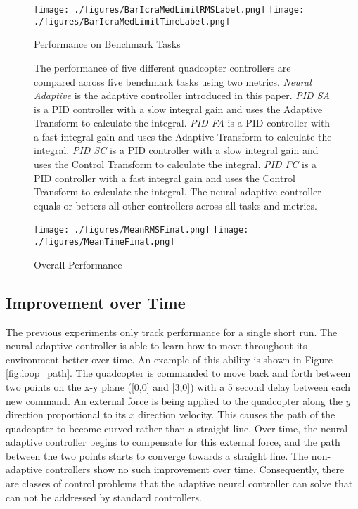 \documentclass[letterpaper, 10 pt, conference]{ieeeconf}  %
\begin{document}
\begin{figure}
\centering
\texttt{[image: ./figures/BarIcraMedLimitRMSLabel.png]}
\texttt{[image: ./figures/BarIcraMedLimitTimeLabel.png]}
\caption{Performance on Benchmark Tasks}
\label{fig:Benchmarks}
\captionsetup{singlelinecheck=off,font=footnotesize}
\caption*{The performance of five different quadcopter controllers are compared across five benchmark tasks using two metrics. \textit{Neural Adaptive} is the adaptive controller introduced in this paper. \textit{PID SA} is a PID controller with a slow integral gain and uses the Adaptive Transform to calculate the integral. \textit{PID FA} is a PID controller with a fast integral gain and uses the Adaptive Transform to calculate the integral. \textit{PID SC} is a PID controller with a slow integral gain and uses the Control Transform to calculate the integral. \textit{PID FC} is a PID controller with a fast integral gain and uses the Control Transform to calculate the integral. The neural adaptive controller equals or betters all other controllers across all tasks and metrics.}
\end{figure}

\begin{figure}
\centering
\texttt{[image: ./figures/MeanRMSFinal.png]}
\texttt{[image: ./figures/MeanTimeFinal.png]}
\caption{Overall Performance}
\label{fig:OverallPerformance}
\captionsetup{singlelinecheck=off,font=footnotesize}
\caption*{}
\end{figure}


\subsection{Improvement over Time}

The previous experiments only track performance for a single short run. 
The neural adaptive controller is able to learn how to move throughout its environment better over time.
An example of this ability is shown in Figure \ref{fig:loop_path}.
The quadcopter is commanded to move back and forth between two points on the x-y plane ([0,0] and [3,0]) with a 5 second delay between each new command.
An external force is being applied to the quadcopter along the $y$ direction proportional to its $x$ direction velocity.
This causes the path of the quadcopter to become curved rather than a straight line.
Over time, the neural adaptive controller begins to compensate for this external force, and the path between the two points starts to converge towards a straight line.
The non-adaptive controllers show no such improvement over time.
Consequently, there are classes of control problems that the adaptive neural controller can solve that can not be addressed by standard controllers.
\end{document}
